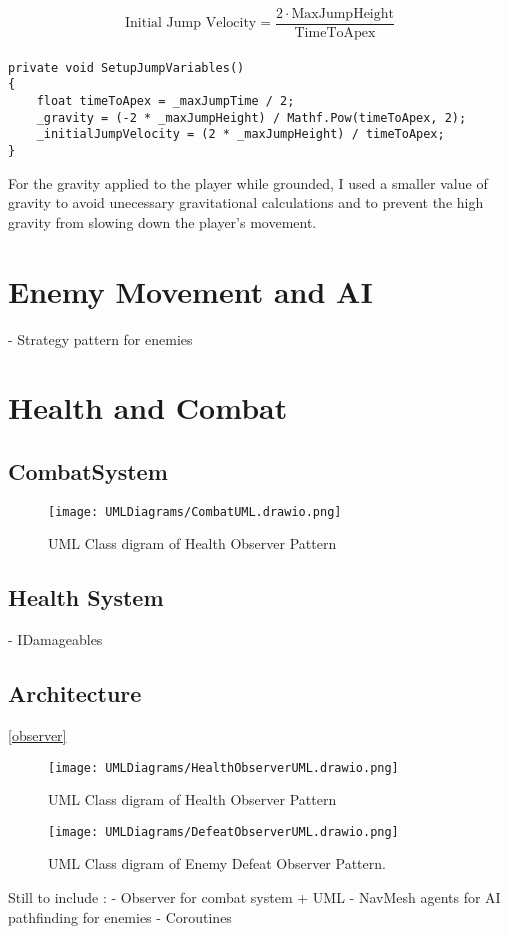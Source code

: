 \documentclass[]{final_report}
\begin{document}
\begin{equation}
\text{Initial Jump Velocity} = \frac{2 \cdot \text{MaxJumpHeight}}{\text{TimeToApex}}
\end{equation}
\paragraph{}
\begin{verbatim}
private void SetupJumpVariables()
{
    float timeToApex = _maxJumpTime / 2;
    _gravity = (-2 * _maxJumpHeight) / Mathf.Pow(timeToApex, 2);
    _initialJumpVelocity = (2 * _maxJumpHeight) / timeToApex;
}
\end{verbatim}
For the gravity applied to the player while grounded, I used a smaller value of gravity to avoid unecessary gravitational calculations and to prevent the high gravity from slowing down the player's movement. \newline

\section{Enemy Movement and AI}
- Strategy pattern for enemies \newline
\section{Health and Combat}
\subsection{CombatSystem}
\begin{figure}[h!]
    \centering
    \texttt{[image: UMLDiagrams/CombatUML.drawio.png]}
    \caption{UML Class digram of Health Observer Pattern}
    \label{fig:label_observer1}
\end{figure}
\subsection{Health System}
- IDamageables\newline


\subsection{Architecture}

\ref{observer}
\begin{figure}[h!]
    \centering
    \texttt{[image: UMLDiagrams/HealthObserverUML.drawio.png]}
    \caption{UML Class digram of Health Observer Pattern}
    \label{fig:label_observer1}
\end{figure}
\begin{figure}[h!]
    \centering
    \texttt{[image: UMLDiagrams/DefeatObserverUML.drawio.png]}
    \caption{UML Class digram of Enemy Defeat Observer Pattern.}
    \label{fig:label_observer2}
\end{figure}
Still to include : \newline
- Observer for combat system + UML \newline
- NavMesh agents for AI pathfinding for enemies \newline
- Coroutines  \newline
\end{document}
